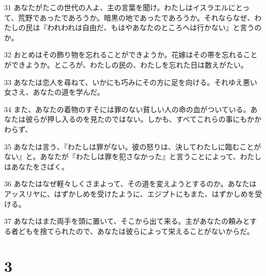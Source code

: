 \par 31 あなたがたこの世代の人よ、主の言葉を聞け。わたしはイスラエルにとって、荒野であったであろうか。暗黒の地であったであろうか。それならなぜ、わたしの民は『われわれは自由だ、もはやあなたのところへは行かない』と言うのか。
\par 32 おとめはその飾り物を忘れることができようか。花嫁はその帯を忘れることができようか。ところが、わたしの民の、わたしを忘れた日は数えがたい。
\par 33 あなたは恋人を尋ねて、いかにも巧みにその方に足を向ける。それゆえ悪い女さえ、あなたの道を学んだ。
\par 34 また、あなたの着物のすそには罪のない貧しい人の命の血がついている。あなたは彼らが押し入るのを見たのではない。しかも、すべてこれらの事にもかかわらず、
\par 35 あなたは言う、『わたしは罪がない。彼の怒りは、決してわたしに臨むことがない』と。あなたが『わたしは罪を犯さなかった』と言うことによって、わたしはあなたをさばく。
\par 36 あなたはなぜ軽々しくさまよって、その道を変えようとするのか。あなたはアッスリヤに、はずかしめを受けたように、エジプトにもまた、はずかしめを受ける。
\par 37 あなたはまた両手を頭に置いて、そこから出て来る。主があなたの頼みとする者どもを捨てられたので、あなたは彼らによって栄えることがないからだ。

\chapter{3}

